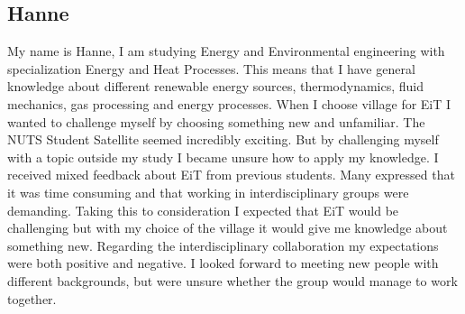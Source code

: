 \subsection{Hanne}

My name is Hanne, I am studying Energy and Environmental engineering with specialization Energy and Heat Processes. This means that I have general knowledge about different renewable energy sources, thermodynamics, fluid mechanics, gas processing and energy processes. When I choose village for EiT I wanted to challenge myself by choosing something new and unfamiliar. The NUTS Student Satellite seemed incredibly exciting. But by challenging myself with a topic outside my study I became unsure how to apply my knowledge. I received mixed feedback about EiT from previous students. Many expressed that it was time consuming and that working in interdisciplinary groups were demanding. Taking this to consideration I expected that EiT would be challenging but with my choice of the village it would give me knowledge about something new. Regarding the interdisciplinary collaboration my expectations were both positive and negative. I looked forward to meeting new people with different backgrounds, but were unsure whether the group would manage to work together. 